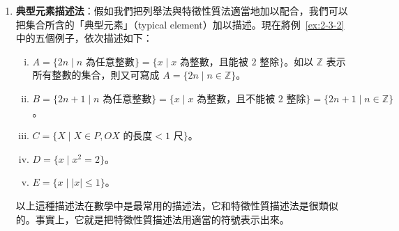 \begin{enumerate}[(一)]
  \begin{example}\label{ex:2-3-2}
  \begin{enumerate}[(i)]
    \item 「偶數全體所成的集合」，「所有能被 $2$ 整除的整數所成的集合」，都是用來描述一個元素為 $0, \pm 2, \pm 4, \pm 6, \dots$ 的集合。
    \item 同樣地，「奇數全體所成的集合」，「所有不能被 $2$ 整除的整數所成的集合」，都是用來描述一個元素為 $\pm 1, \pm 3, \pm 5, \dots$ 的集合。
    \item 在平面 $P$ 上，一個以 $O$ 點為圓心、$1$ 尺為半徑的圓內的點所成的集合，也可以用「所有和 $O$ 點的距離小於 $1$ 尺的點所成的集合」去加以描述。
    \item $\{+\sqrt{2}, -\sqrt{2}\}$ 這一集合也可描述為「其平方為 $2$ 的數所成的集合」。
    \item 所有絕對值小於或等於 $1$ 的實數成一集合。
  \end{enumerate}
  \end{example}

  以上這種描述法是我們常用的。在本章第一節中我們曾一再強調數學符號的第一要素就是明確。所以在我們用「某一性質」去描述一個集合時，該性質一定要絕對明確；譬如：「大於 $100000$」是一個明確的性質，但是「相當大」就不是一個明確的性質。所以假如你隨隨便便說：「$A$ 是由相當大的有理數所成的集合」，別人一定會問究竟大到什麼程度才叫相當大？

  \item \textbf{典型元素描述法}：假如我們把列舉法與特徵性質法適當地加以配合，我們可以把集合所含的「典型元素」（typical element）加以描述。現在將例~\ref{ex:2-3-2} 中的五個例子，依次描述如下：
  \begin{enumerate}[(i)]
    \item $A = \{2n \mid n \text{ 為任意整數}\} = \{x \mid x \text{ 為整數，且能被 } 2 \text{ 整除}\}$。如以 $\mathbb{Z}$ 表示所有整數的集合，則又可寫成 $A = \{2n \mid n \in \mathbb{Z}\}$。
    \item $B = \{2n+1 \mid n \text{ 為任意整數}\} = \{x \mid x \text{ 為整數，且不能被 } 2 \text{ 整除}\} = \{2n+1 \mid n \in \mathbb{Z}\}$。
    \item $C = \{X \mid X \in P, OX \text{ 的長度} < 1 \text{ 尺}\}$。
    \item $D = \{x \mid x^2 = 2\}$。
    \item $E = \{x \mid |x| \le 1\}$。
  \end{enumerate}
  以上這種描述法在數學中是最常用的描述法，它和特徵性質描述法是很類似的。事實上，它就是把特徵性質描述法用適當的符號表示出來。
\end{enumerate}

